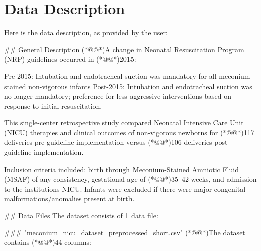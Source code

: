 \documentclass[11pt]{article}
\begin{document}




\clearpage
\appendix

\section{Data Description} \label{sec:data_description} Here is the data description, as provided by the user:

\begin{codeoutput}
\#\# General Description
(*@@*)A change in Neonatal Resuscitation Program (NRP) guidelines occurred in (*@@*)2015:

Pre-2015: Intubation and endotracheal suction was mandatory for all meconium-stained non-vigorous infants
Post-2015: Intubation and endotracheal suction was no longer mandatory; preference for less aggressive interventions based on response to initial resuscitation.

This single-center retrospective study compared Neonatal Intensive Care Unit (NICU) therapies and clinical outcomes of non-vigorous newborns for (*@@*)117 deliveries pre-guideline implementation versus (*@@*)106 deliveries post-guideline implementation.

Inclusion criteria included: birth through Meconium-Stained Amniotic Fluid (MSAF) of any consistency, gestational age of (*@@*)35--42 weeks, and admission to the institutions NICU. Infants were excluded if there were major congenital malformations/anomalies present at birth.

\#\# Data Files
The dataset consists of 1 data file:

\#\#\# "meconium\_nicu\_dataset\_preprocessed\_short.csv"
(*@@*)The dataset contains (*@@*)44 columns:


\end{codeoutput}
\end{document}

